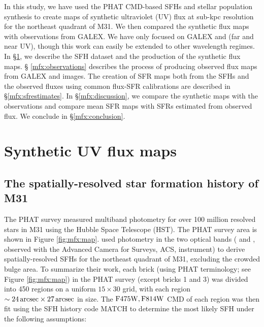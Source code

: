 \documentclass[iop, tighten]{emulateapj}
\begin{document}
In this study, we have used the PHAT CMD-based SFHs and stellar population
synthesis to create maps of synthetic ultraviolet (UV) flux at sub-kpc
resolution for the northeast quadrant of M31. We then compared the synthetic
flux maps with observations from GALEX. We have only focused on GALEX \fuv{}
and \nuv{} (far and near UV), though this work can easily be extended to other
wavelength regimes. In \S \ref{mfx:syntheticfluxmaps}, we describe the SFH
dataset and the production of the synthetic flux maps. \S
\ref{mfx:observations} describes the process of producing observed flux maps
from GALEX \fuv{} and \nuv{} images. The creation of SFR maps both from the
SFHs and the observed fluxes using common flux-SFR calibrations are described
in \S \ref{mfx:sfrestimates}. In \S \ref{mfx:discussion}, we compare the
synthetic maps with the observations and compare mean SFR maps with SFRs
estimated from observed flux. We conclude in \S \ref{mfx:conclusion}.








\section{Synthetic UV flux maps}\label{mfx:syntheticfluxmaps}



\subsection{The spatially-resolved star formation history of M31}

The PHAT survey \citep{Dalcanton:2012} measured multiband photometry for over
100 million resolved stars in M31 using the Hubble Space Telescope (HST). The
PHAT survey area is shown in Figure \ref{fig:mfx:map}. \citet{Lewis:2014}
used photometry in the two optical bands (\acsb{} and \acsi{}, observed with
the Advanced Camera for Surveys, ACS, instrument) to derive spatially-resolved
SFHs for the northeast quadrant of M31, excluding the crowded bulge area. To
summarize their work, each brick (using PHAT terminology; see Figure
\ref{fig:mfx:map}) in the PHAT survey (except bricks 1 and 3) was divided
into 450 regions on a uniform $15 \times 30$ grid, with each region $\sim
24\,\mathrm{arcsec} \times 27\,\mathrm{arcsec}$ in size. The $\mathrm{F475W},\mathrm{F814W}$ CMD of each region was
then fit using the SFH history code MATCH \citep{Dolphin:2002} to determine the
most likely SFH under the following assumptions:
\end{document}
